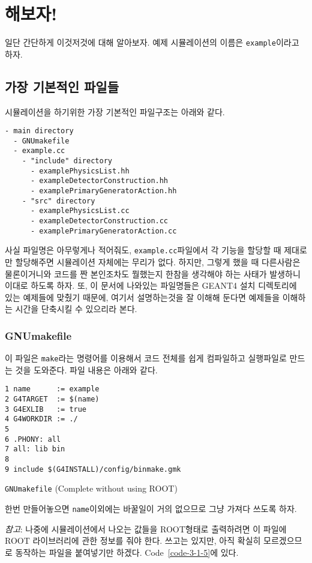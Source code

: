 \chapter{해보자!}

일단 간단하게 이것저것에 대해 알아보자. 예제 시뮬레이션의 이름은
\texttt{example}이라고 하자.

\section{가장 기본적인 파일들}

시뮬레이션을 하기위한 가장 기본적인 파일구조는 아래와 같다.
\begin{verbatim}
- main directory
  - GNUmakefile
  - example.cc
    - "include" directory
      - examplePhysicsList.hh
      - exampleDetectorConstruction.hh
      - examplePrimaryGeneratorAction.hh
    - "src" directory
      - examplePhysicsList.cc
      - exampleDetectorConstruction.cc
      - examplePrimaryGeneratorAction.cc
\end{verbatim}
사실 파일명은 아무렇게나 적어줘도, \texttt{example.cc}파일에서 각 기능을 할당할 때
제대로만 할당해주면 시뮬레이션 자체에는 무리가 없다. 하지만, 그렇게 했을 때
다른사람은 물론이거니와 코드를 짠 본인조차도 뭘했는지 한참을 생각해야 하는
사태가 발생하니 이대로 하도록 하자. 또, 이 문서에 나와있는 파일명들은
GEANT4 설치 디렉토리에 있는 예제들에 맞췄기 때문에, 여기서 설명하는것을 잘
이해해 둔다면 예제들을 이해하는 시간을 단축시킬 수 있으리라 본다.

\subsection{GNUmakefile}
이 파일은 \texttt{make}라는 명령어를 이용해서 코드 전체를 쉽게 컴파일하고 실행파일로
만드는 것을 도와준다. 파일 내용은 아래와 같다.

\begin{code}[h]
\begin{lstlisting}
1 name      := example
2 G4TARGET  := $(name)
3 G4EXLIB   := true
4 G4WORKDIR := ./
5 
6 .PHONY: all
7 all: lib bin
8 
9 include $(G4INSTALL)/config/binmake.gmk
\end{lstlisting}
\caption{\texttt{GNUmakefile} (Complete without using ROOT) \label{code-3-1}}
\end{code}
한번 만들어놓으면 \texttt{name}이외에는 바꿀일이 거의 없으므로 그냥 가져다 쓰도록
하자.

\vspace{5mm}
\emph{참고}: 나중에 시뮬레이션에서 나오는 값들을 ROOT형태로 출력하려면 이
파일에 ROOT 라이브러리에 관한 정보를 줘야 한다. 쓰고는 있지만, 아직 확실히
모르겠으므로 동작하는 파일을 붙여넣기만 하겠다. Code~\ref{code-3-1-5}에 있다.

